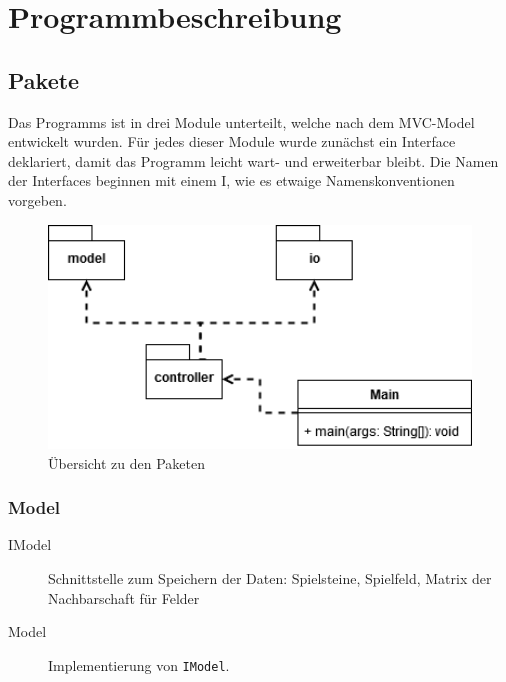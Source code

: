 \chapter{Programmbeschreibung}
\label{chap:Programmbeschreibung}
\section{Pakete}
Das Programms ist in drei Module unterteilt, welche nach dem MVC-Model entwickelt wurden. Für jedes dieser Module wurde zunächst ein Interface deklariert, damit das Programm leicht wart- und erweiterbar bleibt. Die Namen der Interfaces beginnen mit einem \glqq I\grqq, wie es etwaige Namenskonventionen vorgeben.
\begin{figure}[!h]
	\centering
	\includegraphics[width=1\textwidth]{./../Diagramme/PackageDiagram.png}
	\caption{Übersicht zu den Paketen}
\end{figure}
\clearpage
\subsection{Model}
\begin{description}
	\item[IModel] Schnittstelle zum Speichern der Daten: Spielsteine, Spielfeld, Matrix der Nachbarschaft für Felder
	\item [Model] Implementierung von \lstinline{IModel}.
\end{description}


